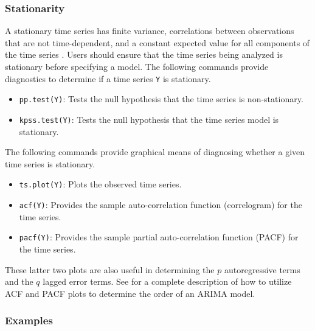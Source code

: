 \subsubsection*{Stationarity}
A stationary time series has finite variance, correlations between
observations that are not time-dependent, and a constant expected
value for all components of the time series \citep[p.\ 12]{BroDav91}.
Users should ensure that the time series being analyzed is stationary
before specifying a model.  The following commands provide diagnostics
to determine if a time series {\tt Y} is stationary.
\begin{itemize}
\item {\tt pp.test(Y)}: Tests the null hypothesis that the time series
  is non-stationary.  
\item {\tt kpss.test(Y)}: Tests the null hypothesis that the time
  series model is stationary.
\end{itemize}  
The following commands provide graphical means of diagnosing whether a
given time series is stationary.  
\begin{itemize}
\item {\tt ts.plot(Y)}: Plots the observed time series.  
\item {\tt acf(Y)}: Provides the sample auto-correlation function
(correlogram) for the time series.
\item {\tt pacf(Y)}: Provides the sample partial auto-correlation
  function (PACF) for the time series.  \\
\end{itemize}
These latter two plots are also useful in determining the $p$
autoregressive terms and the $q$ lagged error terms.  See
\cite{Enders04} for a complete description of how to utilize ACF and
PACF plots to determine the order of an ARIMA model.

\subsubsection*{Examples}


